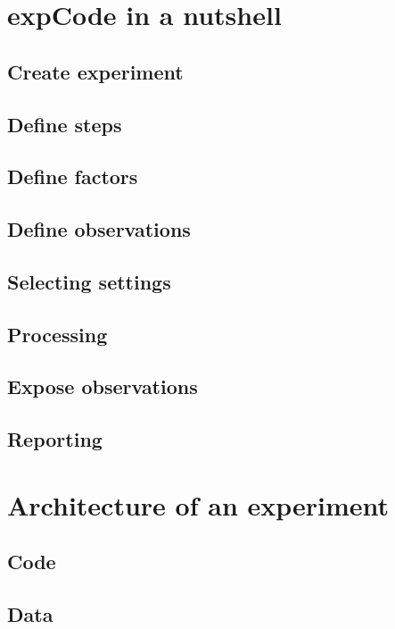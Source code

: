 \documentclass[10pt,a4paper,fleqn]{article}
\newcommand{\expcode}{\textsf{expCode} }
\begin{document}
\section{\expcode in a nutshell}

\subsection{Create experiment}

\subsection{Define steps}

\subsection{Define factors}

\subsection{Define observations}

\subsection{Selecting settings}

\subsection{Processing}

\subsection{Expose observations}

\subsection{Reporting}


\section{Architecture of an experiment}

\subsection{Code}

\subsection{Data}
\end{document}
